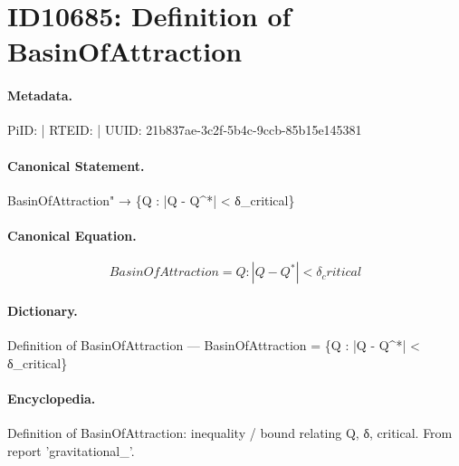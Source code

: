 \section*{ID10685: Definition of BasinOfAttraction}
\paragraph{Metadata.}
PiID:  | RTEID:  | UUID: 21b837ae-3c2f-5b4c-9ccb-85b15e145381

\paragraph{Canonical Statement.}
BasinOfAttraction" → \{Q : |Q - Q\textasciicircum{}*| < δ\_critical\}

\paragraph{Canonical Equation.}
\[
BasinOfAttraction = {Q : |Q - Q^*| < δ_critical}
\]

\paragraph{Dictionary.}
Definition of BasinOfAttraction — BasinOfAttraction = \{Q : |Q - Q\textasciicircum{}*| < δ\_critical\}

\paragraph{Encyclopedia.}
Definition of BasinOfAttraction: inequality / bound relating Q, δ, critical. From report 'gravitational\_'.
